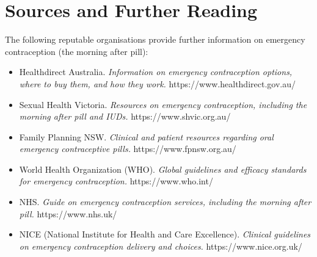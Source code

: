 \section*{Sources and Further Reading}
The following reputable organisations provide further information on emergency contraception (the morning after pill):
\begin{itemize}
    \item Healthdirect Australia. \textit{Information on emergency contraception options, where to buy them, and how they work.} https://www.healthdirect.gov.au/
    \item Sexual Health Victoria. \textit{Resources on emergency contraception, including the morning after pill and IUDs.} https://www.shvic.org.au/
    \item Family Planning NSW. \textit{Clinical and patient resources regarding oral emergency contraceptive pills.} https://www.fpnsw.org.au/
    \item World Health Organization (WHO). \textit{Global guidelines and efficacy standards for emergency contraception.} https://www.who.int/
    \item NHS. \textit{Guide on emergency contraception services, including the morning after pill.} https://www.nhs.uk/
    \item NICE (National Institute for Health and Care Excellence). \textit{Clinical guidelines on emergency contraception delivery and choices.} https://www.nice.org.uk/
\end{itemize}
